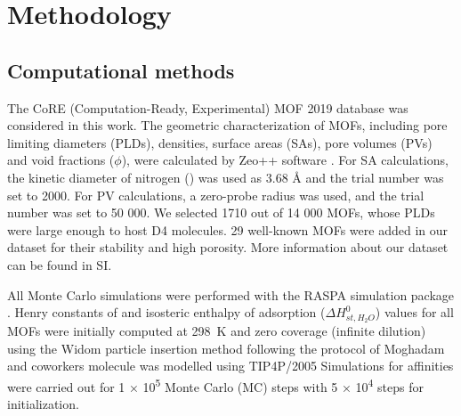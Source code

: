 \section{Methodology}\label{methodology}

\subsection{Computational methods}\label{methodology-computational}

The CoRE (Computation-Ready, Experimental) MOF 2019 database
\citep{chungAdvancesUpdatesAnalytics2019} was considered in this work. The
geometric characterization of MOFs, including pore limiting diameters (PLDs),
densities, surface areas (SAs), pore volumes (PVs) and void fractions
(\(\phi\)), were calculated by Zeo++ software
\citep{willemsAlgorithmsToolsHighthroughput2012}. For SA calculations, the
kinetic diameter of nitrogen () was used as 3.68 Å and the trial number
was set to 2000. For PV calculations, a zero-probe radius was used, and the
trial number was set to 50 000. We selected 1710 out of 14 000 MOFs, whose PLDs
were large enough to host D4 molecules. 29 well-known MOFs were added in our
dataset for their stability and high porosity. More information about our
dataset can be found in SI.

All Monte Carlo simulations were performed with the RASPA simulation package
\citep{dubbeldamRASPAMolecularSimulation2016}. Henry constants of  and
isosteric enthalpy of adsorption (\(\Delta H_{st,H_{2}O}^{0}\)) values for all
MOFs were initially computed at \SI{298}{\kelvin} and zero coverage (infinite
dilution) using the Widom particle insertion method
\citep{frenkelUnderstandingMolecularSimulation2002} following the protocol of
Moghadam and coworkers \citep{moghadamEfficientIdentificationHydrophobic2016}
 molecule was modelled using TIP4P/2005
\citep{abascalGeneralPurposeModel2005} Simulations for  affinities were
carried out for 1 × 10\textsuperscript{5} Monte Carlo (MC) steps with 5 ×
10\textsuperscript{4} steps for initialization.

